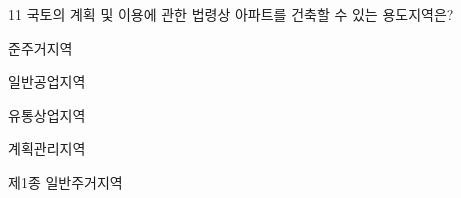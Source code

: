 \begin{question}{11}
국토의 계획 및 이용에 관한 법령상 아파트를 건축할 수 있는 용도지역은?
\begin{choices}
  \item 준주거지역
  \item 일반공업지역
  \item 유통상업지역
  \item 계획관리지역
  \item 제1종 일반주거지역
\end{choices}
\end{question}

